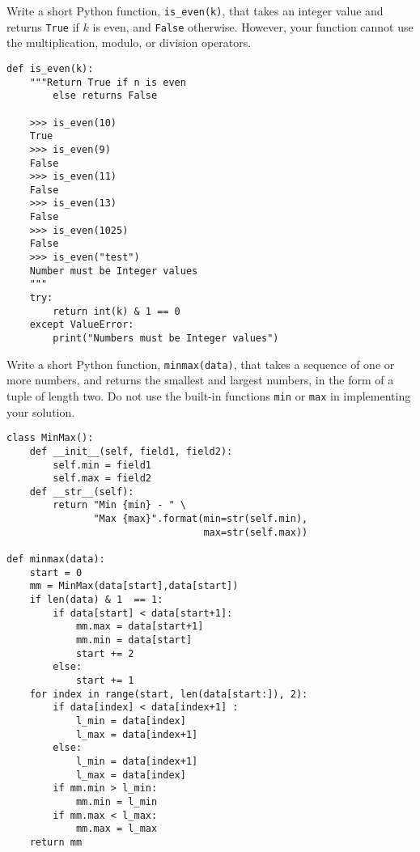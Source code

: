  \label{sssec:ex1_2}

Write a short Python function, \texttt{is\_even(k)}, that takes an integer value and returns \texttt{True} if $k$ is even, and \texttt{False} otherwise. However, your function cannot use the multiplication, modulo, or division operators.

\begin{lstlisting}[title=Exercise R-1.2]
def is_even(k):
    """Return True if n is even 
		else returns False

    >>> is_even(10)
    True
    >>> is_even(9)
    False
    >>> is_even(11)
    False
    >>> is_even(13)
    False
    >>> is_even(1025)
    False
    >>> is_even("test")
    Number must be Integer values
    """
    try:
        return int(k) & 1 == 0
    except ValueError:
        print("Numbers must be Integer values")
\end{lstlisting}

 \label{sssec:ex1_3}

Write a short Python function, \texttt{minmax(data)}, that takes a sequence of one or more numbers, and returns the smallest and largest numbers, in the form of a tuple of length two. Do not use the built-in functions \texttt{min} or \texttt{max} in implementing your solution.

\begin{lstlisting}[title=Exercise R-1.3]
class MinMax():
    def __init__(self, field1, field2):
        self.min = field1
        self.max = field2
    def __str__(self):
        return "Min {min} - " \
               "Max {max}".format(min=str(self.min), 
                                  max=str(self.max))

def minmax(data):
    start = 0
    mm = MinMax(data[start],data[start])
    if len(data) & 1  == 1:
        if data[start] < data[start+1]:
            mm.max = data[start+1]
            mm.min = data[start]
            start += 2
        else:
            start += 1
    for index in range(start, len(data[start:]), 2):
        if data[index] < data[index+1] :
            l_min = data[index]
            l_max = data[index+1]
        else:
            l_min = data[index+1]
            l_max = data[index]
        if mm.min > l_min:
            mm.min = l_min
        if mm.max < l_max:
            mm.max = l_max
    return mm
\end{lstlisting}